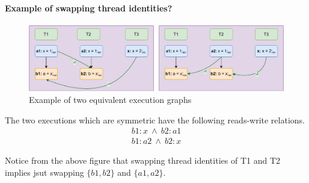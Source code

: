     \paragraph{Example of swapping thread identities?}
        
        \begin{figure}[H]
            \centering
            \includegraphics[scale=0.7]{Equivalence_Example.pdf}
            \caption{Example of two equivalent execution graphs}
        \end{figure}

        The two executions which are symmetric have the following reads-write relations. 
        \begin{align*}
            b1:x \ \wedge \ b2:a1 \\
            b1:a2 \ \wedge \ b2:x 
        \end{align*}

        Notice from the above figure that swapping thread identities of T1 and T2 implies jsut swapping $\{b1, b2\}$ and $\{a1, a2\}$.
        



